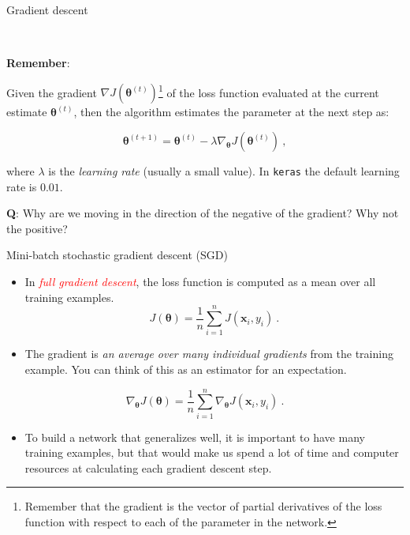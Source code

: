 \documentclass[10pt,ignorenonframetext,]{beamer}
\providecommand{\tightlist}{%
  \setlength{\itemsep}{0pt}\setlength{\parskip}{0pt}}
\begin{document}
\begin{frame}[fragile]

\begin{block}{Gradient descent}

\(~\)

\textbf{Remember}:

Given the gradient
\(\nabla J({\boldsymbol \theta}^{(t)})\)\footnote{Remember that the gradient is the vector of partial derivatives of the loss function with respect to each of the parameter in the network.}
of the loss function evaluated at the current estimate
\({\boldsymbol \theta}^{(t)}\), then the algorithm estimates the
parameter at the next step as:

\[{\boldsymbol \theta}^{(t+1)}={\boldsymbol \theta}^{(t)} - \lambda \nabla_{\boldsymbol \theta} J({\boldsymbol \theta}^{(t)}) \ , \]

where \(\lambda\) is the \emph{learning rate} (usually a small value).
In \texttt{keras} the default learning rate is \(0.01\).

\vspace{6mm}

\textbf{Q}: Why are we moving in the direction of the negative of the
gradient? Why not the positive?

\end{block}

\end{frame}

\begin{frame}

\begin{block}{Mini-batch stochastic gradient descent (SGD)}

\vspace{2mm}

\begin{itemize}
\item
  In \emph{\textcolor{red}{full gradient descent}}, the loss function is
  computed as a mean over all training examples. \[
  J({\boldsymbol \theta})=\frac{1}{n}\sum_{i=1}^n J({\boldsymbol x}_i, y_i) \ .
  \]
\item
  The gradient is \emph{an average over many individual gradients} from
  the training example. You can think of this as an estimator for an
  expectation.
\end{itemize}

\[
\nabla_{\boldsymbol \theta} J({\boldsymbol \theta})=\frac{1}{n}\sum_{i=1}^n \nabla_{\boldsymbol \theta} J({\boldsymbol x}_i, y_i) \ .
\]

\begin{itemize}
\tightlist
\item
  To build a network that generalizes well, it is important to have many
  training examples, but that would make us spend a lot of time and
  computer resources at calculating each gradient descent step.
\end{itemize}

\end{block}

\end{frame}
\end{document}
